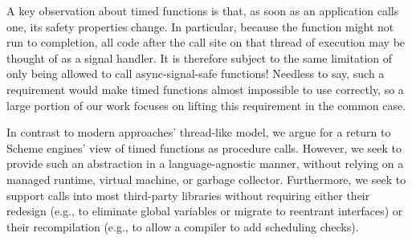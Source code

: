 A key observation about timed functions is that, as soon as an application calls one,
its safety properties change.  In particular, because the function might not run to
completion, all code after the call site on that thread of execution may be thought
of as a signal handler.  It is therefore subject to the same limitation of only being
allowed to call async-signal-safe functions!  Needless to say, such a requirement
would make timed functions almost impossible to use correctly, so a large portion of
our work focuses on lifting this requirement in the common case.

In contrast to modern approaches' thread-like model, we argue for a return to Scheme
engines' view of timed functions as procedure calls.  However, we seek to provide
such an abstraction in a language-agnostic manner, without relying on a managed
runtime, virtual machine, or garbage collector.  Furthermore, we seek to support
calls into most third-party libraries without requiring either their redesign (e.g.,
to eliminate global variables or migrate to reentrant interfaces) or their
recompilation (e.g., to allow a compiler to add scheduling checks).

